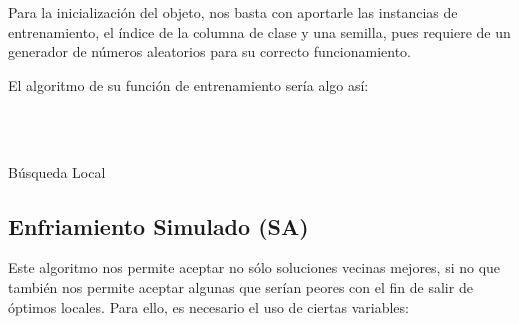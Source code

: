 \documentclass[a4paper, 11pt]{article}
\begin{document}
			Para la inicialización del objeto, nos basta con aportarle las instancias de entrenamiento,
			el índice de la columna de clase y una semilla, pues requiere de un generador de números
			aleatorios para su correcto funcionamiento.

			El algoritmo de su función de entrenamiento sería algo así:
			
			\begin{algorithm}[H]
				\begin{algorithmic}[1]
					\REQUIRE \ \\
							 \

					
				     	
				     	\ELSE
				     	\ENDIF
					\ENDWHILE
				\end{algorithmic}
			\caption{Búsqueda Local}
			\label{LS}
			\end{algorithm}			

		\subsection{Enfriamiento Simulado (\textbf{SA})}
			Este algoritmo nos permite aceptar no sólo soluciones vecinas mejores, si no que también nos
			permite aceptar algunas que serían peores con el fin de salir de óptimos locales. Para ello,
			es necesario el uso de ciertas variables:
\end{document}
